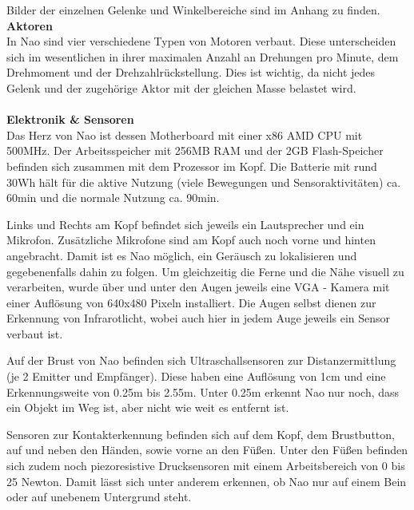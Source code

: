 \noindent
Bilder der einzelnen Gelenke und Winkelbereiche sind im Anhang zu finden.
\newline \newline
\noindent
\textbf{Aktoren}
\\
In Nao sind vier verschiedene Typen von Motoren verbaut. Diese unterscheiden sich im wesentlichen in ihrer maximalen Anzahl an Drehungen pro Minute, dem Drehmoment und der Drehzahlrückstellung. Dies ist wichtig, da nicht jedes Gelenk und der zugehörige Aktor mit der gleichen Masse belastet wird.
\\
\\
\textbf{Elektronik \& Sensoren}
\\
Das Herz von Nao ist dessen Motherboard mit einer x86 AMD CPU mit 500MHz. Der Arbeitsspeicher mit 256MB RAM und der 2GB Flash-Speicher befinden sich zusammen mit dem Prozessor im Kopf.  Die Batterie mit rund 30Wh hält für die aktive Nutzung (viele Bewegungen und Sensoraktivitäten) ca. 60min und die normale Nutzung ca. 90min. 

Links und Rechts am Kopf befindet sich jeweils ein Lautsprecher und ein Mikrofon. Zusätzliche Mikrofone sind am Kopf auch noch vorne und hinten angebracht. Damit ist es Nao möglich, ein Geräusch zu lokalisieren und gegebenenfalls dahin zu folgen. Um gleichzeitig die Ferne und die Nähe visuell zu verarbeiten, wurde über und unter den Augen jeweils eine VGA - Kamera mit einer Auflösung von 640x480 Pixeln installiert. Die Augen selbst dienen zur Erkennung von Infrarotlicht, wobei auch hier in jedem Auge jeweils ein Sensor verbaut ist.

Auf der Brust von Nao befinden sich Ultraschallsensoren zur Distanzermittlung (je 2 Emitter und Empfänger). Diese haben eine Auflösung von 1cm und eine Erkennungsweite von 0.25m bis 2.55m. Unter 0.25m erkennt Nao nur noch, dass ein Objekt im Weg ist, aber nicht wie weit es entfernt ist.

Sensoren zur Kontakterkennung befinden sich auf dem Kopf, dem Brustbutton, auf und neben den Händen, sowie vorne an den Füßen. Unter den Füßen befinden sich zudem noch piezoresistive Drucksensoren mit einem Arbeitsbereich von 0 bis 25 Newton. Damit lässt sich unter anderem erkennen, ob Nao nur auf einem Bein oder auf unebenem Untergrund steht.

